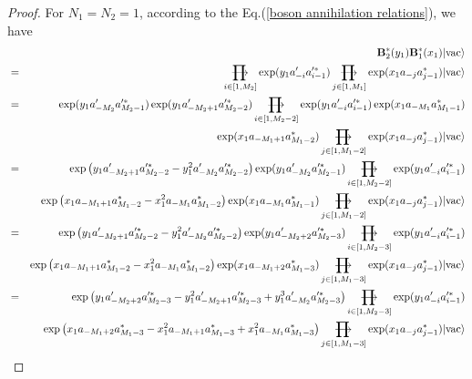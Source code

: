 \documentclass[10pt,a4paper]{amsart}
\numberwithin{equation}{section}
\def\rprod{\mathop{\prod{\mkern-28.0mu}{\mathbf\longrightarrow}}}
\begin{document}
\begin{proof}
For $N_{1}=N_{2}=1$, according to the Eq.(\ref{boson annihilation relations}), we have
\begin{eqnarray}
&&\mathbf{B}^{\ast}_{2}(y_{1})\mathbf{B}^{\ast}_{1}(x_{1})|\text{vac}\rangle\notag\\
&=&\rprod\limits
_{i\in[1,M_{2}]}\exp(y_{1}a^{\prime}_{-i}a^{\prime\ast}_{i-1})\rprod\limits
_{j\in[1,M_{1}]}\exp(x_{1}a_{-j}a^{\ast}_{j-1})|\text{vac}\rangle\notag\\
&=&\exp(y_{1}a^{\prime}_{-M_{2}}a^{\prime\ast}_{M_{2}-1})
\exp(y_{1}a^{\prime}_{-M_{2}+1}a^{\prime\ast}_{M_{2}-2})\rprod\limits
_{i\in[1,M_{2}-2]}\exp(y_{1}a^{\prime}_{-i}a^{\prime\ast}_{i-1})\exp(x_{1}a_{-M_{1}}
a^{\ast}_{M_{1}-1})\notag\\
&&\exp(x_{1}a_{-M_{1}+1}a^{\ast}_{M_{1}-2})\rprod\limits
_{j\in[1,M_{1}-2]}\exp(x_{1}a_{-j}a^{\ast}_{j-1})|\text{vac}\rangle\notag\\
&=&\exp\left(y_{1}a^{\prime}_{-M_{2}+1}a^{\prime\ast}_{M_{2}-2}-y^{2}_{1}
a^{\prime}_{-M_{2}}a^{\prime\ast}_{M_{2}-2}\right)
\exp(y_{1}a^{\prime}_{-M_{2}}a^{\prime\ast}_{M_{2}-1})\rprod\limits
_{i\in[1,M_{2}-2]}\exp(y_{1}a^{\prime}_{-i}a^{\prime\ast}_{i-1})\notag\\
&&\exp\left(x_{1}a_{-M_{1}+1}a^{\ast}_{M_{1}-2}-x^{2}_{1}a_{-M_{1}}a^{\ast}_{M_{1}-2}\right)
\exp(x_{1}a_{-M_{1}}a^{\ast}_{M_{1}-1})\rprod\limits
_{j\in[1,M_{1}-2]}\exp(x_{1}a_{-j}a^{\ast}_{j-1})|\text{vac}\rangle\notag\\
&=&\exp\left(y_{1}a^{\prime}_{-M_{2}+1}a^{\prime\ast}_{M_{2}-2}-y^{2}_{1}
a^{\prime}_{-M_{2}}a^{\prime\ast}_{M_{2}-2}\right)\exp(y_{1}a^{\prime}_{-M_{2}+2}
a^{\prime\ast}_{M_{2}-3})\rprod\limits
_{i\in[1,M_{2}-3]}\exp(y_{1}a^{\prime}_{-i}a^{\prime\ast}_{i-1})\notag\\
&&\exp\left(x_{1}a_{-M_{1}+1}a^{\ast}_{M_{1}-2}-x^{2}_{1}a_{-M_{1}}a^{\ast}_{M_{1}-2}\right)
\exp(x_{1}a_{-M_{1}+2}a^{\ast}_{M_{1}-3})\rprod\limits
_{j\in[1,M_{1}-3]}\exp(x_{1}a_{-j}a^{\ast}_{j-1})|\text{vac}\rangle\notag\\
&=&\exp\left(y_{1}a^{\prime}_{-M_{2}+2}a^{\prime\ast}_{M_{2}-3}-y^{2}_{1}
a^{\prime}_{-M_{2}+1}a^{\prime\ast}_{M_{2}-3}+y^{3}_{1}a^{\prime}_{-M_{2}}
a^{\prime\ast}_{M_{2}-3}\right)\rprod\limits
_{i\in[1,M_{2}-3]}\exp(y_{1}a^{\prime}_{-i}a^{\prime\ast}_{i-1})\notag\\
&&\exp\left(x_{1}a_{-M_{1}+2}a^{\ast}_{M_{1}-3}-x^{2}_{1}a_{-M_{1}+1}a^{\ast}_{M_{1}-3}
+x^{2}_{1}a_{-M_{1}}a^{\ast}_{M_{1}-3}\right)\rprod\limits
_{j\in[1,M_{1}-3]}\exp(x_{1}a_{-j}a^{\ast}_{j-1})|\text{vac}\rangle\notag\\

\end{eqnarray}
\end{proof}
\end{document}
